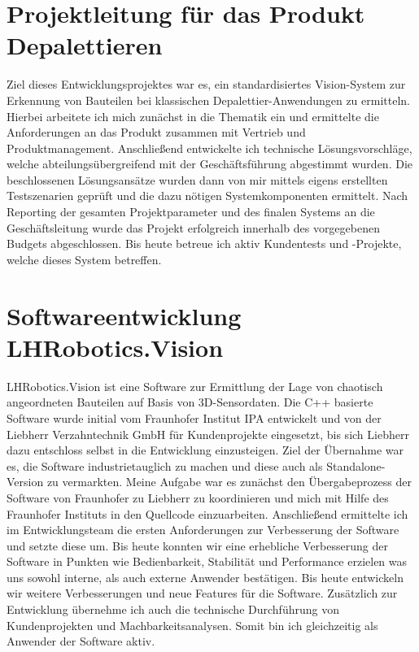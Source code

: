 \documentclass[11pt,a4paper]{moderncv}
\begin{document}
\section{Projektleitung für das Produkt  Depalettieren} 
Ziel dieses Entwicklungsprojektes war es, ein standardisiertes Vision-System zur Erkennung von Bauteilen bei klassischen Depalettier-Anwendungen zu ermitteln. Hierbei arbeitete ich mich zunächst in die Thematik ein und ermittelte die Anforderungen an das Produkt zusammen mit Vertrieb und Produktmanagement. Anschließend entwickelte ich technische Lösungsvorschläge, welche abteilungsübergreifend mit der Geschäftsführung abgestimmt wurden. Die beschlossenen Lösungsansätze wurden dann von mir mittels eigens erstellten Testszenarien geprüft und die dazu nötigen Systemkomponenten ermittelt. Nach Reporting der gesamten Projektparameter und des finalen Systems an die Geschäftsleitung wurde das Projekt erfolgreich innerhalb des vorgegebenen Budgets abgeschlossen. Bis heute betreue ich aktiv Kundentests und -Projekte, welche dieses System betreffen.

\section{Softwareentwicklung LHRobotics.Vision} 
LHRobotics.Vision ist eine Software zur Ermittlung der Lage von chaotisch angeordneten Bauteilen auf Basis von 3D-Sensordaten. Die C++ basierte Software wurde initial vom Fraunhofer Institut IPA entwickelt und von der Liebherr Verzahntechnik GmbH für Kundenprojekte eingesetzt, bis sich Liebherr dazu entschloss selbst in die Entwicklung einzusteigen. Ziel der Übernahme war es, die Software industrietauglich zu machen und diese auch als Standalone-Version zu vermarkten. Meine Aufgabe war es zunächst den Übergabeprozess der Software von Fraunhofer zu Liebherr zu koordinieren und mich mit Hilfe des Fraunhofer Instituts in den Quellcode einzuarbeiten. Anschließend ermittelte ich im Entwicklungsteam die ersten Anforderungen zur Verbesserung der Software und setzte diese um. Bis heute konnten wir eine erhebliche Verbesserung der Software in Punkten wie Bedienbarkeit, Stabilität und Performance erzielen was uns sowohl interne, als auch externe Anwender bestätigen. Bis heute entwickeln wir weitere Verbesserungen und neue Features für die Software. Zusätzlich zur Entwicklung übernehme ich auch die technische Durchführung von Kundenprojekten und Machbarkeitsanalysen. Somit bin ich gleichzeitig als Anwender der Software aktiv.
\end{document}
